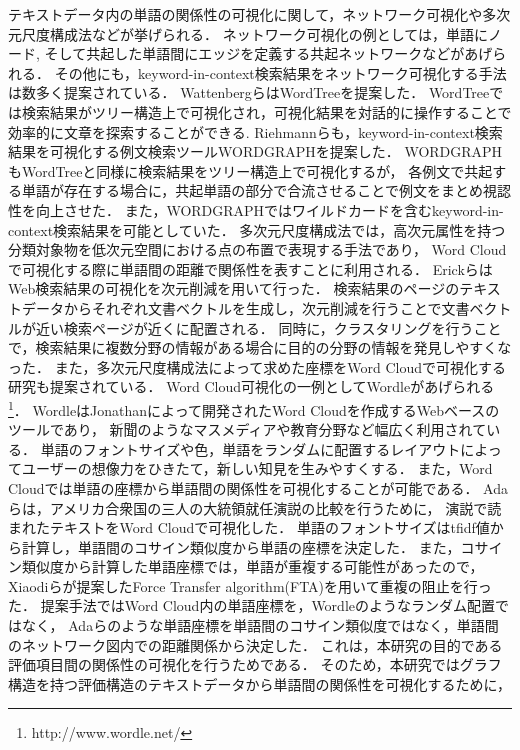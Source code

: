 \documentclass[syuuron]{kuee}
\begin{document}
		テキストデータ内の単語の関係性の可視化に関して，ネットワーク可視化や多次元尺度構成法などが挙げられる．
		ネットワーク可視化の例としては，単語にノード, 
		そして共起した単語間にエッジを定義する共起ネットワークなどがあげられる．
		その他にも，keyword-in-context検索結果をネットワーク可視化する手法は数多く提案されている．
		WattenbergらはWordTreeを提案した\cite{wt1}．
		WordTreeでは検索結果がツリー構造上で可視化され，可視化結果を対話的に操作することで効率的に文章を探索することができる.
		Riehmannらも，keyword-in-context検索結果を可視化する例文検索ツールWORDGRAPHを提案した\cite{wg1}．
		WORDGRAPHもWordTreeと同様に検索結果をツリー構造上で可視化するが，
		各例文で共起する単語が存在する場合に，共起単語の部分で合流させることで例文をまとめ視認性を向上させた．
		また，WORDGRAPHではワイルドカードを含むkeyword-in-context検索結果を可能としていた．		
		多次元尺度構成法では，高次元属性を持つ分類対象物を低次元空間における点の布置で表現する手法であり，
		Word Cloudで可視化する際に単語間の距離で関係性を表すことに利用される\cite{wc2}．
		ErickらはWeb検索結果の可視化を次元削減を用いて行った\cite{or1}．
		検索結果のページのテキストデータからそれぞれ文書ベクトルを生成し，次元削減を行うことで文書ベクトルが近い検索ページが近くに配置される．
		同時に，クラスタリングを行うことで，検索結果に複数分野の情報がある場合に目的の分野の情報を発見しやすくなった．
		また，多次元尺度構成法によって求めた座標をWord Cloudで可視化する研究も提案されている．
		Word Cloud可視化の一例としてWordleがあげられる\footnote{http://www.wordle.net/}．
		WordleはJonathanによって開発されたWord Cloudを作成するWebベースのツールであり，
		新聞のようなマスメディアや教育分野など幅広く利用されている\cite{wc2}．
		単語のフォントサイズや色，単語をランダムに配置するレイアウトによってユーザーの想像力をひきたて，新しい知見を生みやすくする．
		また，Word Cloudでは単語の座標から単語間の関係性を可視化することが可能である．
		Adaらは，アメリカ合衆国の三人の大統領就任演説の比較を行うために，
		演説で読まれたテキストをWord Cloudで可視化した\cite{fta2}．
		単語のフォントサイズはtfidf値から計算し，単語間のコサイン類似度から単語の座標を決定した．
		また，コサイン類似度から計算した単語座標では，単語が重複する可能性があったので，
		Xiaodiらが提案したForce Transfer algorithm(FTA)を用いて重複の阻止を行った\cite{fta1}．
		提案手法ではWord Cloud内の単語座標を，Wordleのようなランダム配置ではなく，
		Adaらのような単語座標を単語間のコサイン類似度ではなく，単語間のネットワーク図内での距離関係から決定した．
		これは，本研究の目的である評価項目間の関係性の可視化を行うためである．
		そのため，本研究ではグラフ構造を持つ評価構造のテキストデータから単語間の関係性を可視化するために，
\end{document}
